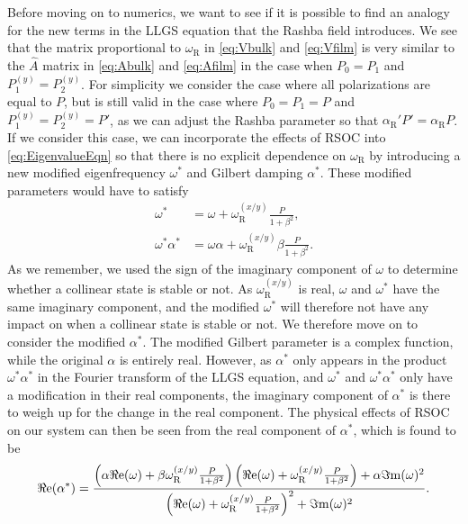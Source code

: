 Before moving on to numerics, we want to see if it is possible to find an analogy for the new terms in the LLGS equation that the Rashba field introduces. We see that the matrix proportional to $\omega_{\text{R}}$ in \eqref{eq:Vbulk} and \eqref{eq:Vfilm} is very similar to the $\hat{A}$ matrix in \eqref{eq:Abulk} and \eqref{eq:Afilm} in the case when $P_0=P_1$ and $P_1^{(y)}=P_2^{(y)}$. For simplicity we consider the case where all polarizations are equal to $P$, but is still valid in the case where $P_0=P_1=P$ and $P_1^{(y)}=P_2^{(y)}=P'$, as we can adjust the Rashba parameter so that $\alpha_{\text{R}}'P' = \alpha_{\text{R}}P$. If we consider this case, we can incorporate the effects of RSOC into \eqref{eq:EigenvalueEqn} so that there is no explicit dependence on $\omega_{\text{R}}$ by introducing a new modified eigenfrequency $\omega^*$ and Gilbert damping $\alpha^*$. These modified parameters would have to satisfy
\begin{subequations}
\begin{align}
    \omega^* &= \omega+\omega_{\text{R}}^{(x/y)}\frac{P}{1+\beta^2}, \\
    \omega^*\alpha^* &= \omega\alpha+\omega_{\text{R}}^{(x/y)}\beta\frac{P}{1+\beta^2}.
\end{align}
\end{subequations}
As we remember, we used the sign of the imaginary component of $\omega$ to determine whether a collinear state is stable or not. As $\omega_{\text{R}}^{(x/y)}$ is real, $\omega$ and $\omega^*$ have the same imaginary component, and the modified $\omega^*$ will therefore not have any impact on when a collinear state is stable or not. We therefore move on to consider the modified $\alpha^*$. The modified Gilbert parameter is a complex function, while the original $\alpha$ is entirely real. However, as $\alpha^*$ only appears in the product $\omega^*\alpha^*$ in the Fourier transform of the LLGS equation, and $\omega^*$ and $\omega^*\alpha^*$ only have a modification in their real components, the imaginary component of $\alpha^*$ is there to weigh up for the change in the real component. The physical effects of RSOC on our system can then be seen from the real component of $\alpha^*$, which is found to be
\begin{align}
    {\Re\mathrm{e}}(\alpha^*) = \frac{\left(\alpha{\Re\mathrm{e}}(\omega) + \beta\omega^{(x/y)}_{\text{R}} \frac{P}{1+\beta^2}\right)\left({\Re\mathrm{e}}(\omega) + \omega^{(x/y)}_{\text{R}} \frac{P}{1+\beta^2}\right) + \alpha{\Im\mathrm{m}}(\omega)^2}{\left({\Re\mathrm{e}}(\omega) + \omega^{(x/y)}_{\text{R}} \frac{P}{1+\beta^2}\right)^2+{\Im\mathrm{m}}(\omega)^2}.
\end{align}
